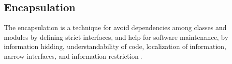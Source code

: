\subsection{Encapsulation}

The encapsulation is a technique for 
avoid dependencies among 
classes and modules by defining 
strict interfaces, and 
help for software 
maintenance, 
by information hidding,
understandability of code, 
localization of information,
narrow interfaces,  
and information restriction \cite{Lieberherr:1988}. 


